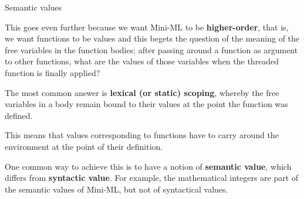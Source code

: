 %
\begin{frame}{Semantic values}

  This goes even further because we want Mini-ML to be
  \textbf{higher\hyp{}order}, that is, we want functions to be values
  and this begets the question of the meaning of the free variables in
  the function bodies: after passing around a function as argument to
  other functions, what are the values of those variables when the
  threaded function is finally applied?

  \bigskip

  The most common answer is \textbf{lexical (or static) scoping},
  whereby the free variables in a body remain bound to their values at
  the point the function was defined.

  \bigskip

  This means that values corresponding to functions have to carry
  around the environment at the point of their definition.

  \bigskip

  One common way to achieve this is to have a notion of
  \textbf{semantic value}, which differs from \textbf{syntactic
    value}. For example, the mathematical integers are part of the
  semantic values of Mini\hyp{}ML, but not of syntactical values.

\end{frame}

